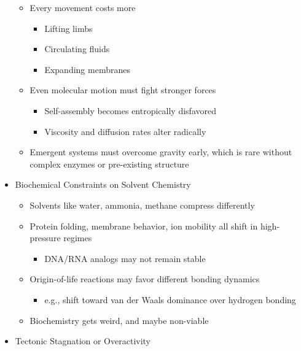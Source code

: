 \documentclass[
  letterpaper,
]{book}
\providecommand{\tightlist}{%
  \setlength{\itemsep}{0pt}\setlength{\parskip}{0pt}}
\begin{document}
\begin{itemize}
  \begin{itemize}
  \tightlist
  \item
    Every movement costs more

    \begin{itemize}
    \tightlist
    \item
      Lifting limbs
    \item
      Circulating fluids
    \item
      Expanding membranes
    \end{itemize}
  \item
    Even molecular motion must fight stronger forces

    \begin{itemize}
    \tightlist
    \item
      Self-assembly becomes entropically disfavored
    \item
      Viscosity and diffusion rates alter radically
    \end{itemize}
  \item
    Emergent systems must overcome gravity early, which is rare without
    complex enzymes or pre-existing structure
  \end{itemize}
\item
  Biochemical Constraints on Solvent Chemistry

  \begin{itemize}
  \tightlist
  \item
    Solvents like water, ammonia, methane compress differently
  \item
    Protein folding, membrane behavior, ion mobility all shift in
    high-pressure regimes

    \begin{itemize}
    \tightlist
    \item
      DNA/RNA analogs may not remain stable
    \end{itemize}
  \item
    Origin-of-life reactions may favor different bonding dynamics

    \begin{itemize}
    \tightlist
    \item
      e.g., shift toward van der Waals dominance over hydrogen bonding
    \end{itemize}
  \item
    Biochemistry gets weird, and maybe non-viable
  \end{itemize}
\item
  Tectonic Stagnation or Overactivity


\end{itemize}
\end{document}
